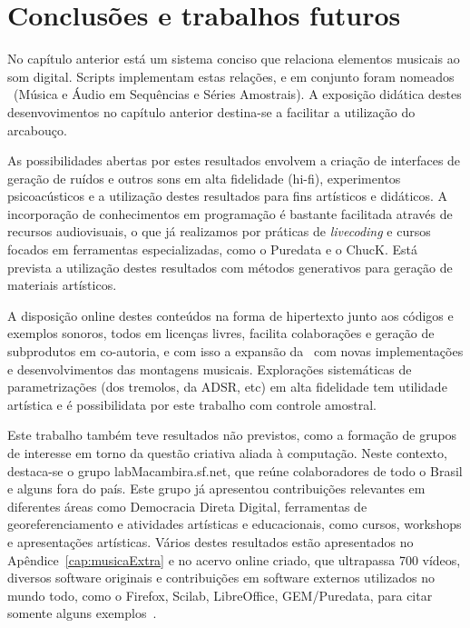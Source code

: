 \chapter{Conclusões e trabalhos futuros} %
\label{cap:conclusao}

No capítulo anterior está um sistema conciso
que relaciona elementos musicais ao som digital. Scripts 
implementam estas relações, e em conjunto foram nomeados \massa\ (Música
e Áudio em Sequências e Séries Amostrais). 
A exposição didática destes desenvovimentos no
capítulo anterior destina-se a facilitar a utilização
do arcabouço.

As possibilidades abertas por estes resultados envolvem a criação de interfaces de geração de ruídos e outros sons em alta fidelidade (hi-fi), experimentos psicoacústicos e a utilização destes resultados para fins artísticos e didáticos. A incorporação de conhecimentos
em programação é bastante facilitada através de recursos audiovisuais, o que já realizamos por práticas de \emph{livecoding} e cursos focados em ferramentas especializadas, como o Puredata e o ChucK.
Está prevista a utilização destes resultados com
métodos generativos para geração de materiais artísticos.

A disposição online destes conteúdos na forma de hipertexto junto aos códigos e exemplos sonoros, todos em licenças livres, facilita colaborações e geração de subprodutos em co-autoria, e com isso a expansão da \massa\ com novas implementações e desenvolvimentos das montagens musicais.
Explorações sistemáticas de parametrizações (dos tremolos, da ADSR, etc) em alta fidelidade tem utilidade artística e é possibilidata por este trabalho com controle amostral. 

Este trabalho também teve resultados não previstos, como a formação de grupos
de interesse em torno da questão criativa aliada à computação.
Neste contexto, destaca-se o grupo
labMacambira.sf.net, que reúne colaboradores de todo o Brasil e alguns fora do país.
Este grupo
já apresentou contribuições relevantes em diferentes áreas
como Democracia Direta Digital, ferramentas de georeferenciamento e
atividades artísticas e educacionais, como cursos, workshops e apresentações artísticas. Vários destes resultados estão apresentados no Apêndice~\ref{cap:musicaExtra} e no acervo online criado, que ultrapassa 700 vídeos, diversos software originais e contribuições em software externos utilizados no mundo todo, como o Firefox, Scilab, LibreOffice, GEM/Puredata, para citar somente alguns exemplos~\cite{siteLM,wikiLM,vimeoLM}.








